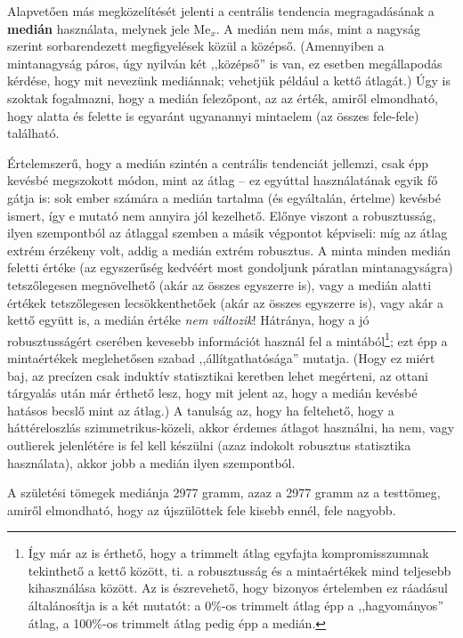 \documentclass[]{book}
\let\rmarkdownfootnote\footnote%
\def\footnote{\protect\rmarkdownfootnote}
\begin{document}
Alapvetően más megközelítését jelenti a centrális tendencia
megragadásának a \textbf{medián} használata, melynek jele
\(\mathrm{Me}_x\). A medián nem más, mint a nagyság szerint
sorbarendezett megfigyelések közül a középső. (Amennyiben a mintanagyság
páros, úgy nyilván két ,,középső'' is van, ez esetben megállapodás
kérdése, hogy mit nevezünk mediánnak; vehetjük például a kettő átlagát.)
Úgy is szoktak fogalmazni, hogy a medián felezőpont, az az érték, amiről
elmondható, hogy alatta és felette is egyaránt ugyanannyi mintaelem (az
összes fele-fele) található.

Értelemszerű, hogy a medián szintén a centrális tendenciát jellemzi,
csak épp kevésbé megszokott módon, mint az átlag -- ez egyúttal
használatának egyik fő gátja is: sok ember számára a medián tartalma (és
egyáltalán, értelme) kevésbé ismert, így e mutató nem annyira jól
kezelhető. Előnye viszont a robusztusság, ilyen szempontból az átlaggal
szemben a másik végpontot képviseli: míg az átlag extrém érzékeny volt,
addig a medián extrém robusztus. A minta minden medián feletti értéke
(az egyszerűség kedvéért most gondoljunk páratlan mintanagyságra)
tetszőlegesen megnövelhető (akár az összes egyszerre is), vagy a medián
alatti értékek tetszőlegesen lecsökkenthetőek (akár az összes egyszerre
is), vagy akár a kettő együtt is, a medián értéke \emph{nem változik}!
Hátránya, hogy a jó robusztusságért cserében kevesebb információt
használ fel a
mintából\footnote{Így már az is érthető, hogy a trimmelt átlag egyfajta kompromisszumnak tekinthető a kettő között, ti. a robusztusság és a mintaértékek mind teljesebb kihasználása között. Az is észrevehető, hogy bizonyos értelemben ez ráadásul általánosítja is a két mutatót: a 0\%-os trimmelt átlag épp a ,,hagyományos'' átlag, a 100\%-os trimmelt átlag pedig épp a medián.};
ezt épp a mintaértékek meglehetősen szabad ,,állítgathatósága'' mutatja.
(Hogy ez miért baj, az precízen csak induktív statisztikai keretben
lehet megérteni, az ottani tárgyalás után már érthető lesz, hogy mit
jelent az, hogy a medián kevésbé hatásos becslő mint az átlag.) A
tanulság az, hogy ha feltehető, hogy a háttéreloszlás
szimmetrikus-közeli, akkor érdemes átlagot használni, ha nem, vagy
outlierek jelenlétére is fel kell készülni (azaz indokolt robusztus
statisztika használata), akkor jobb a medián ilyen szempontból.

A születési tömegek mediánja 2977 gramm, azaz a 2977 gramm az a
testtömeg, amiről elmondható, hogy az újszülöttek fele kisebb ennél,
fele nagyobb.
\end{document}
